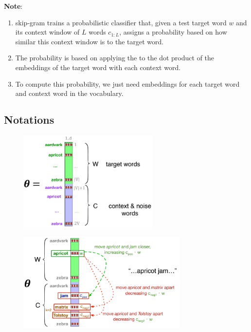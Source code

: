 \vspace{0.2cm}
\noindent\textbf{Note}:
\begin{enumerate}
    \item skip-gram trains a probabilistic classifier that, given a test target word $w$ and its context window of $L$ words $c_{1:L}$, assigns a probability based on how similar this context window is to the target word.

    \item The probability is based on applying the  to the dot product of the embeddings of the target word with each context word. 
    
    \item To compute this probability, we just need embeddings for each target word and context word in the vocabulary.
\end{enumerate}


\subsection*{Notations}
\begin{table}[h]
    \begin{minipage}{0.44\linewidth}
        \begin{figure}[H]
            \centering
            \includegraphics[width=\linewidth, height=5cm, keepaspectratio]{Pictures/info-retrieval/skip-gram-6-13.png}
        \end{figure}
    \end{minipage}
    \hfill
    \vrule
    \hfill
    \begin{minipage}{0.55\linewidth}
        \begin{figure}[H]
            \includegraphics[width=\linewidth, height=5cm, keepaspectratio]{Pictures/info-retrieval/skip-gram-6-14.png}
        \end{figure}
    \end{minipage}
\end{table}

